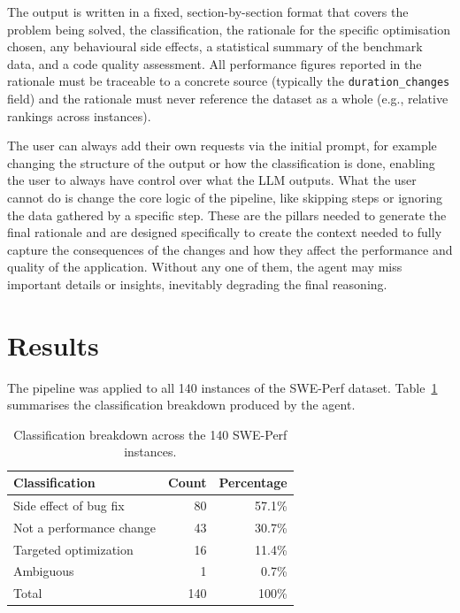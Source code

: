\documentclass[12pt, a4paper]{article}
\begin{document}
The output is written in a fixed, section-by-section format that covers the problem being solved, the classification, the rationale for the specific optimisation chosen, any behavioural side effects, a statistical summary of the benchmark data, and a code quality assessment.
All performance figures reported in the rationale must be traceable to a concrete source (typically the \texttt{duration\_changes} field) and the rationale must never reference the dataset as a whole (e.g., relative rankings across instances).

The user can always add their own requests via the initial prompt, for example changing the structure of the output or how the classification is done, enabling the user to always have control over what the LLM outputs.
What the user cannot do is change the core logic of the pipeline, like skipping steps or ignoring the data gathered by a specific step. These are the pillars needed to generate the final rationale and are designed specifically to create the context needed to fully capture the consequences of the changes and how they affect the performance and quality of the application.
Without any one of them, the agent may miss important details or insights, inevitably degrading the final reasoning.

\section{Results}
\label{sec:results}

The pipeline was applied to all 140 instances of the SWE-Perf dataset. Table~\ref{tab:classification} summarises the classification breakdown produced by the agent.

\begin{table}[h]
\centering
\begin{tabular}{lrr}
\toprule
\textbf{Classification} & \textbf{Count} & \textbf{Percentage} \\
\midrule
Side effect of bug fix   & 80 & 57.1\% \\
Not a performance change & 43 & 30.7\% \\
Targeted optimization    & 16 & 11.4\% \\
Ambiguous                &  1 &  0.7\% \\
\midrule
Total                    & 140 & 100\% \\
\bottomrule
\end{tabular}
\caption{Classification breakdown across the 140 SWE-Perf instances.}
\label{tab:classification}
\end{table}
\end{document}
